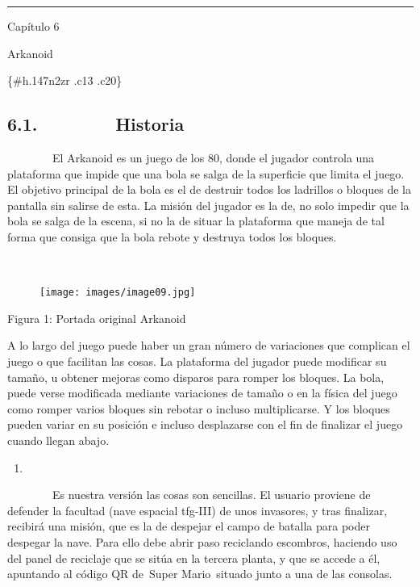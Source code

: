 \begin{center}\rule{3in}{0.4pt}\end{center}

Capítulo 6

Arkanoid

\{\#h.147n2zr .c13 .c20\}

\subsection{6.1.~~~~~~~~Historia}\label{historia}

~~~~~~~~El Arkanoid es un juego de los 80, donde el jugador controla una
plataforma que impide que una bola se salga de la superficie que limita
el juego. El objetivo principal de la bola es el de destruir todos los
ladrillos o bloques de la pantalla sin salirse de esta. La misión del
jugador es la de, no solo impedir que la bola se salga de la escena, si
no la de situar la plataforma que maneja de tal forma que consiga que la
bola rebote y destruya todos los bloques.

~~~~~~~~~~~~~~~~~ ~~~~~~~~~~~~~~~~~

\begin{figure}[htbp]
\centering
\texttt{[image: images/image09.jpg]}
\end{figure}

Figura 1: Portada original Arkanoid

A lo largo del juego puede haber un gran número de variaciones que
complican el juego o que facilitan las cosas. La plataforma del jugador
puede modificar su tamaño, u obtener mejoras como disparos para romper
los bloques. La bola, puede verse modificada mediante variaciones de
tamaño o en la física del juego como romper varios bloques sin rebotar o
incluso multiplicarse. Y los bloques pueden variar en su posición e
incluso desplazarse con el fin de finalizar el juego cuando llegan
abajo.

\begin{enumerate}
\def\labelenumi{\arabic{enumi}.}
\setcounter{enumi}{1}
\item
\end{enumerate}

~~~~~~~~Es nuestra versión las cosas son sencillas. El usuario proviene
de defender la facultad (nave espacial tfg-III) de unos invasores, y
tras finalizar, recibirá una misión, que es la de despejar el campo de
batalla para poder despegar la nave. Para ello debe abrir paso
reciclando escombros, haciendo uso del panel de reciclaje que se sitúa
en la tercera planta, y que se accede a él, apuntando al código QR
de~Super Mario~situado junto a una de las consolas.


